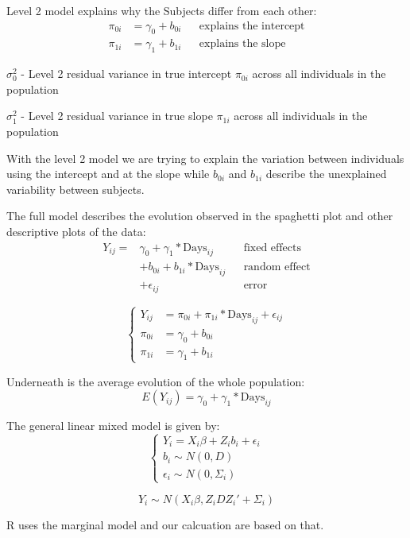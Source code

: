 \documentclass[
]{article}
\begin{document}
Level 2 model explains why the Subjects differ from each other:
\[\begin{aligned}
\pi_{0i} &= \gamma_{0} + b_{0i} && \text{explains the intercept} \\
\pi_{1i} &= \gamma_{1} + b_{1i} && \text{explains the slope}
\end{aligned}\]

\(\sigma_{0}^{2}\) - Level 2 residual variance in true intercept
\(\pi_{0i}\) across all individuals in the population

\(\sigma_{1}^{2}\) - Level 2 residual variance in true slope
\(\pi_{1i}\) across all individuals in the population

With the level 2 model we are trying to explain the variation between
individuals using the intercept and at the slope while \(b_{0i}\) and
\(b_{1i}\) describe the unexplained variability between subjects.

The full model describes the evolution observed in the spaghetti plot
and other descriptive plots of the data: \[\begin{aligned}
Y_{ij} =& \gamma_{0} + \gamma_{1}* \text{Days}_{ij} &&\text{fixed effects}\\
          &+ b_{0i} + b_{1i}*\text{Days}_{ij} &&\text{random effect}\\
          &+ \epsilon_{ij} &&\text{error}
\end{aligned}\]

\[
\begin{cases}
Y_{ij} &= \pi_{0i} + \pi_{1i}* \text{Days}_{ij} + \epsilon_{ij} \\
\pi_{0i} &= \gamma_{0} + b_{0i}  \\
\pi_{1i} &= \gamma_{1} + b_{1i}
\end{cases}
\]

Underneath is the average evolution of the whole population:
\[E(Y_{ij}) = \gamma_{0} + \gamma_{1}* \text{Days}_{ij}\]

The general linear mixed model is given by: \[\begin{cases}
Y_i = X_i\beta + Z_i b_i + \epsilon_i \\
b_i \sim N(0,D)\\
\epsilon_i \sim N(0,\Sigma_i)
\end{cases}\]

\[Y_i \sim N(X_i\beta, Z_iDZ_i'+\Sigma_i)\]

R uses the marginal model and our calcuation are based on that.
\end{document}
